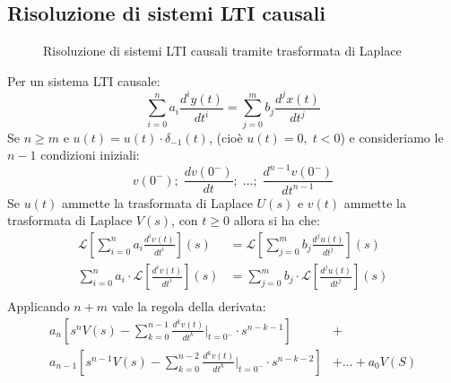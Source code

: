 \documentclass[a4paper]{article}
\begin{document}
\subsection{Risoluzione di sistemi LTI causali}
\begin{figure}[H]
  \centering
  \caption{Risoluzione di sistemi LTI causali tramite trasformata di Laplace}
\end{figure}
Per un sistema LTI causale:
\[
  \sum_{i=0}^{n} a_i \frac{d^{i} y(t)}{dt^{i}} = \sum_{j=0}^{m} b_j \frac{d^{j} x(t)}{dt^{j}}
\] 
Se \( n \ge m \) e \( u(t) = u(t) \cdot \delta_{-1}(t) \), (cioè \( u(t) = 0,\; t < 0 \)) 
e consideriamo le \( n-1 \) condizioni iniziali:
\[
  v(0^-); \; \frac{dv(0^-)}{dt}; \; \ldots; \; \frac{d^{n-1}v(0^-)}{dt^{n-1}}
\] 
Se \( u(t) \) ammette la trasformata di Laplace \( U(s) \) e \( v(t) \) ammette la trasformata
di Laplace \( V(s) \), con \( t \ge 0 \) allora si ha che:
\[
  \begin{aligned}
    \mathcal{L}\left[ \sum_{i=0}^{n} a_i \frac{d^{i} v(t)}{dt^{i}} \right](s) &= \mathcal{L}\left[ \sum_{j=0}^{m} b_j \frac{d^{j} u(t)}{dt^{j}} \right](s)\\
    \sum_{i=0}^{n} a_i \cdot \mathcal{L}\left[ \frac{d^{i} v(t)}{dt^{i}} \right](s) &= \sum_{j=0}^{m} b_j \cdot \mathcal{L}\left[ \frac{d^{j} u(t)}{dt^{j}} \right](s)\\
  \end{aligned}
\] 
Applicando \( n+m \) vale la regola della derivata:
\[
  \begin{aligned}
    a_n \left[ s^n V(s) - \sum_{k=0}^{n-1} \frac{d^{k} v(t)}{dt^{k}} \Big|_{t=0^-} \cdot s^{n-k-1} \right] &+\\
    a_{n-1} \left[ s^{n-1} V(s) - \sum_{k=0}^{n-2} \frac{d^{k} v(t)}{dt^{k}} \Big|_{t=0^-} \cdot s^{n-k-2} \right] &+ \ldots + a_0 V(S)\\
  \end{aligned}
\] 
\end{document}
